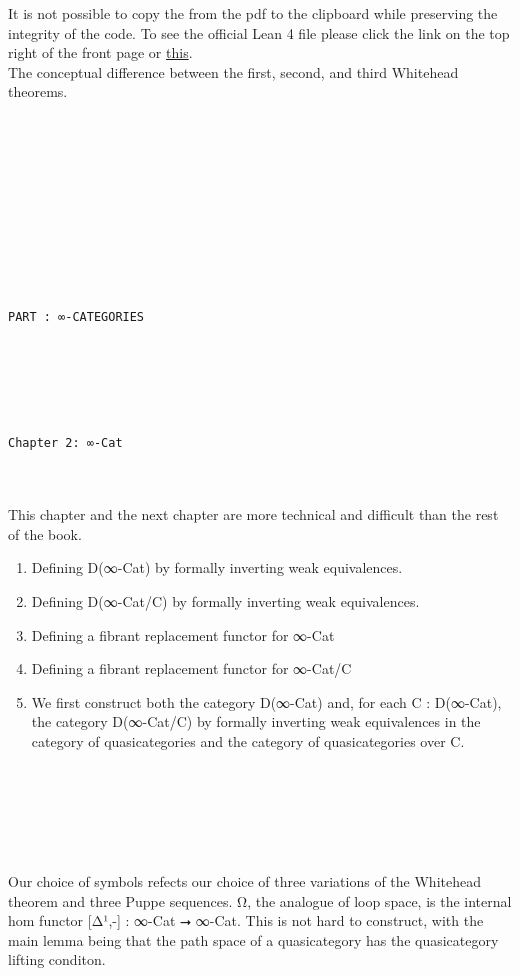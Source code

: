 \documentclass{book}
\theoremstyle{definition}
\newcounter{pcounter}
\newcounter{sectioncount}
\newcounter{subsectioncount}
\renewcommand{\section}[1]{\newpage\ \\ \ \\ \begin{center} \scalebox{1.5}{\texttt{\thesectioncount . #1}} \stepcounter{sectioncount} \setcounter{subsectioncount}{1} \end{center} \begin{center} \ \\ \ \\ \thispagestyle{empty} \end{center}}
\renewcommand{\chapter}[1]{
\newpage
{
\Huge 
\begin{center}
\ \\
\ \\
\thispagestyle{empty}
\texttt{#1}
\end{center}}
\ \\
\ \\
}
\newcounter{partcount}
\renewcommand{\part}[1]{
\newpage
{
\Huge 
\begin{center}
\ \\
\ \\
\ \\
\ \\
\ \\
\ \\
\thispagestyle{empty}
\texttt{PART {\thepartcount}: #1}
\stepcounter{partcount}
\end{center}}
\ \\
\ \\
}
\begin{document}
It is not possible to copy the from the pdf to the clipboard while preserving the integrity of the code. To see the official Lean 4 file please click the link on the top right of the front page or \href{https://github.com/linlib/ThreeWhiteheadTheorems}{this}.\\

The conceptual difference between the first, second, and third Whitehead theorems. 

\ \\
\ \\
\ \\

\part{∞-CATEGORIES}


\chapter{Chapter 2: ∞\texttt{-Cat}}

This chapter and the next chapter are more technical and difficult than the rest of the book.\\

\begin{enumerate}
\item Defining D(∞-Cat) by formally inverting weak equivalences.
\item Defining D(∞-Cat/C) by formally inverting weak equivalences.
\item Defining a fibrant replacement functor for ∞-Cat
\item Defining a fibrant replacement functor for ∞-Cat/C
\item We first construct both the category D(∞-Cat) and, for each C : D(∞-Cat), the category D(∞-Cat/C) by formally inverting weak equivalences in the category of quasicategories and the category of quasicategories over C.
\end{enumerate}


\section{Ω⃗}

Our choice of symbols refects our choice of three variations of the Whitehead theorem and three Puppe sequences. Ω⃗, the analogue of loop space, is the internal hom functor [Δ¹,-] : ∞-Cat ⭢ ∞-Cat. This is not hard to construct, with the main lemma being that the path space of a quasicategory has the quasicategory lifting conditon.\\
\end{document}
